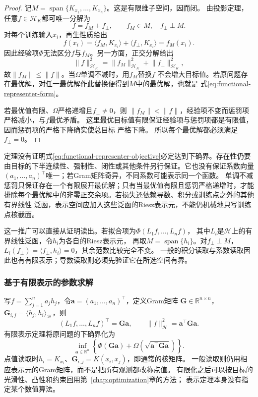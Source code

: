 \begin{proof}
记$M=\operatorname{span}\{K_{x_1},\ldots,K_{x_n}\}$。这是有限维子空间，因而闭。
由投影定理，任意$f\in\mathcal{H}_K$都可唯一分解为
\[
  f=f_M+f_{\perp},\qquad f_M\in M,\quad f_{\perp}\perp M.
\]
对每个训练输入$x_i$，再生性质给出
\[
  f(x_i)
  =
  \langle f_M,K_{x_i}\rangle
  +
  \langle f_{\perp},K_{x_i}\rangle
  =
  f_M(x_i).
\]
因此经验项$\Phi$无法区分$f$与$f_M$。另一方面，正交分解给出
\[
  \lVert f\rVert_{\mathcal{H}_K}^2
  =
  \lVert f_M\rVert_{\mathcal{H}_K}^2
  +
  \lVert f_{\perp}\rVert_{\mathcal{H}_K}^2,
\]
故$\lVert f_M\rVert\leq\lVert f\rVert$。当$\Omega$单调不减时，用$f_M$替换$f$
不会增大目标值。若原问题存在最优解，对任一最优解作此替换便得到$M$中的最优解，也就是
式\eqref{eq:functional-representer-form}。

若最优值有限、$\Omega$严格递增且$f_{\perp}\neq0$，则
$\lVert f_M\rVert<\lVert f\rVert$，经验项不变而惩罚项严格减小，与$f$最优矛盾。
这里最优目标值有限保证经验项与惩罚项都是有限值，因而惩罚项的严格下降确实使总目标
严格下降。
所以每个最优解都必须满足$f_{\perp}=0$。
\end{proof}

定理没有证明式\eqref{eq:functional-representer-objective}必定达到下确界。存在性仍要
由目标的下半连续性、强制性、闭性或其他条件另行保证。它也没有保证系数向量
$(a_1,\ldots,a_n)^{\top}$唯一；若Gram矩阵奇异，不同系数可能表示同一个函数。
单调不减惩罚只保证存在一个有限展开最优解；只有当最优值有限且惩罚严格递增时，才能
排除每个最优解中的非零正交余项。若损失还依赖导数、积分或训练点之外的其他有界线性
泛函，表示空间应加入这些泛函的Riesz表示元，不能仍机械地只写训练点核截面。

这一推广可以直接从证明读出。若拟合项为$\Phi(L_1f,\ldots,L_nf)$，
其中$L_i$是$\mathcal H$上的有界线性泛函，令$h_i$为各自的Riesz表示元，
再取$M=\operatorname{span}\{h_i\}$。对$f_\perp\perp M$，
$L_i(f_\perp)=\langle f_\perp,h_i\rangle=0$，其余范数比较完全不变。
一般的积分读取与系数读取因此也有有限表示；导数读取则必须先验证它在所选空间有界。

\subsubsection{基于有限表示的参数求解}
\label{sec:functional-finite-parameter-solvers}

写$f=\sum_{j=1}^n a_jh_j$，令$\bm a=(a_1,\ldots,a_n)^\top$，定义Gram矩阵
$\bm G\in\mathbb R^{n\times n}$，$\bm G_{i,j}=\langle h_j,h_i\rangle_{\mathcal H}$，则
\[
 (L_1f,\ldots,L_nf)^\top=\bm G\bm a,\qquad
 \lVert f\rVert_{\mathcal H}^2=\bm a^\top\bm G\bm a.
\]
有限表示定理将原问题的下确界化为
\begin{equation}
 \inf_{\bm a\in\mathbb R^n}
 \left\{\Phi(\bm G\bm a)
       +\Omega\!\left(\sqrt{\bm a^\top\bm G\bm a}\right)\right\}.
 \label{eq:functional-finite-gram-objective}
\end{equation}
点值读取时$h_i=K_{x_i}$、$\bm G_{i,j}=K(x_i,x_j)$，即通常的核矩阵。
一般读取则仍用相应表示元的Gram矩阵，而不是把所有观测都改称点值。
有限化之后可以按目标的光滑性、凸性和约束回用第~\ref{chap:optimization}章的方法；
表示定理本身没有指定某个数值算法。


